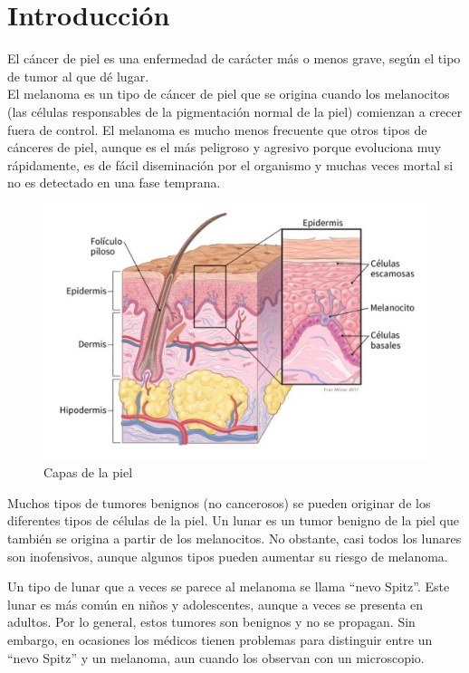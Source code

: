 \section{Introducción}
El cáncer de piel es una enfermedad de carácter más o menos grave, según el tipo de tumor al que dé lugar. \\
El melanoma es un tipo de cáncer de piel que se origina cuando los melanocitos (las células responsables de la pigmentación normal de la piel) comienzan a crecer fuera de control. El melanoma es mucho menos frecuente que otros tipos de cánceres de piel, aunque es el más peligroso y agresivo porque evoluciona muy rápidamente, es de fácil diseminación por el organismo y muchas veces mortal si no es detectado en una fase temprana. 
\bigskip

\begin{figure}[htbp]
    \centering
    \textbf{}\par\medskip
    \includegraphics[scale=0.65]{figures/skin.png}
    \caption{Capas de la piel}
\end{figure}

\pagestyle{fancy}
\fancyhf{}
\newpage
Muchos tipos de tumores benignos (no cancerosos) se pueden originar de los diferentes tipos de células de la piel. Un lunar es un tumor benigno de la piel que también se origina a partir de los melanocitos. No obstante, casi todos los lunares son inofensivos, aunque algunos tipos pueden aumentar su riesgo de melanoma. 

Un tipo de lunar que a veces se parece al melanoma se llama “nevo Spitz”. Este lunar es más común en niños y adolescentes, aunque a veces se presenta en adultos. Por lo general, estos tumores son benignos y no se propagan. Sin embargo, en ocasiones los médicos tienen problemas para distinguir entre un “nevo Spitz” y un melanoma, aun cuando los observan con un microscopio.

